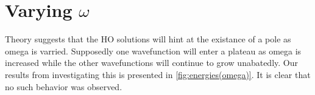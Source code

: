 \documentclass[../main/report.tex]{subfiles}
\begin{document}




\section{Varying $\omega$} 
Theory suggests that the HO solutions will hint at the existance of a pole as omega is varried. 
Supposedly \cite{dolan} one wavefunction will enter a plateau as omega is increased while the other wavefunctions will continue to grow unabatedly. 
Our results from investigating this is presented in \cref{fig:energies(omega)}.
It is clear that no such behavior was observed.
\end{document}
